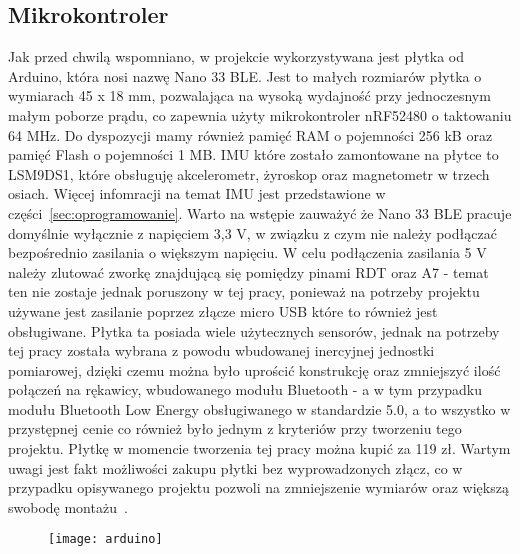 	\subsection{Mikrokontroler}
	\label{subsec:arduino}
	Jak przed chwilą wspomniano, w projekcie wykorzystywana jest płytka od Arduino, która nosi nazwę Nano 33 BLE. Jest to małych rozmiarów płytka o  wymiarach 45 x 18 mm, pozwalająca na wysoką wydajność przy jednoczesnym małym poborze prądu, co zapewnia użyty mikrokontroler nRF52480 o taktowaniu 64 MHz. Do dyspozycji mamy również pamięć RAM o pojemności 256 kB oraz pamięć Flash o pojemności 1 MB. IMU które zostało zamontowane na płytce to LSM9DS1, które obsługuję akcelerometr, żyroskop oraz magnetometr w trzech osiach. Więcej infomracji na temat IMU jest przedstawione w części~\ref{sec:oprogramowanie}. Warto na wstępie zauważyć że Nano 33 BLE pracuje domyślnie wyłącznie z napięciem 3,3 V, w związku z czym nie należy podłączać bezpośrednio zasilania o większym napięciu. W celu podłączenia zasilania 5 V należy zlutować zworkę znajdującą się pomiędzy pinami RDT oraz A7 - temat ten nie zostaje jednak poruszony w tej pracy, ponieważ na potrzeby projektu używane jest zasilanie poprzez złącze micro USB które to również jest obsługiwane. Płytka ta posiada wiele użytecznych sensorów, jednak na potrzeby tej pracy została wybrana z powodu wbudowanej inercyjnej jednostki pomiarowej, dzięki czemu można było uprościć konstrukcję   oraz zmniejszyć ilość połączeń na rękawicy, wbudowanego modułu Bluetooth - a w tym przypadku modułu Bluetooth Low Energy obsługiwanego w standardzie 5.0, a to wszystko w przystępnej cenie co również było jednym z kryteriów przy tworzeniu tego projektu. Płytkę w momencie tworzenia tej pracy można kupić za 119 zł. Wartym uwagi jest fakt możliwości zakupu płytki bez wyprowadzonych złącz, co w przypadku opisywanego projektu pozwoli na zmniejszenie wymiarów oraz większą swobodę montażu~\cite{botland-arduino}.
\begin{figure}[h]
\centering
\texttt{[image: arduino]}
\label{fig:arduino}
\end{figure}
	
